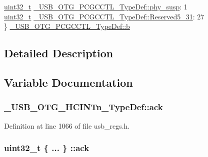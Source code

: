\begin{DoxyCompactItemize}
\begin{tabbing}
\>\hyperlink{stdint_8h_a435d1572bf3f880d55459d9805097f62}{uint32\_t} \hyperlink{group___u_s_b___o_t_g___d_r_i_v_e_r_ga535f75e5436b75614c13d56c654a2b49}{\_USB\_OTG\_PCGCCTL\_TypeDef::phy\_susp}: 1\\
\>\hyperlink{stdint_8h_a435d1572bf3f880d55459d9805097f62}{uint32\_t} \hyperlink{group___u_s_b___o_t_g___d_r_i_v_e_r_ga0a01d405634299e9f2312062b60786ba}{\_USB\_OTG\_PCGCCTL\_TypeDef::Reserved5\_31}: 27\\
\} \hyperlink{group___u_s_b___o_t_g___d_r_i_v_e_r_gab399c7093c52f61852ba9075ffda4665}{\_USB\_OTG\_PCGCCTL\_TypeDef::b}\\

\end{tabbing}\end{DoxyCompactItemize}


\subsection{Detailed Description}


\subsection{Variable Documentation}
\hypertarget{group___u_s_b___o_t_g___d_r_i_v_e_r_ga39f77ce791656afe942d9e317d40b507}{
\subsubsection[{ack}]{ \-\_\-\-U\-S\-B\-\_\-\-O\-T\-G\-\_\-\-H\-C\-I\-N\-Tn\-\_\-\-Type\-Def\-::ack}}\label{group___u_s_b___o_t_g___d_r_i_v_e_r_ga39f77ce791656afe942d9e317d40b507}


Definition at line 1066 of file usb\-\_\-regs.\-h.

\hypertarget{group___u_s_b___o_t_g___d_r_i_v_e_r_gaa01b57d07fee8211dddfd2109d307f8f}{
\subsubsection[{ack}]{\setlength{\rightskip}{0pt plus 5cm}uint32\-\_\-t \{ ... \} \-::ack}}\label{group___u_s_b___o_t_g___d_r_i_v_e_r_gaa01b57d07fee8211dddfd2109d307f8f}



